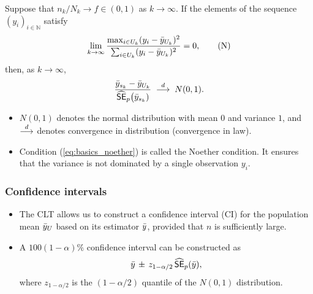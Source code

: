 \documentclass{my_eth_beamer}
\numberwithin{equation}{section}
\begin{document}
\begin{frame}
    \begin{EinSatz}\label{thm:basics_clt}
        \vspace{-0.5em}
        Suppose that $n_k/N_k \rightarrow f \in (0,1)$ as
        $k \rightarrow \infty$. If the elements of the sequence
        $(y_i)_{i \in \mathbb{N}}$ satisfy
        \begin{equation}
            \lim_{k \rightarrow \infty} \frac{\max_{i \in U_k} (y_i -
                \bar{y}_{U_k})^2}{\sum_{i \in U_k}
                (y_i - \bar{y}_{U_k})^2} = 0,
                \tag{N}\label{eq:basics_noether}
        \end{equation}
        \noindent then, as $k \rightarrow \infty$,
        \begin{equation*}
            \frac{\bar{y}_{s_k}
            -\bar{y}_{U_k}}{\widehat{\mathsf{SE}}_p\big(\bar{y}_{s_k})} \;
            \overset{d}{\longrightarrow} \; N(0, 1).
        \end{equation*}
    \end{EinSatz}
    \begin{itemize}
        \item $N(0,1)$ denotes the normal distribution with mean $0$ and
            variance $1$, and $\overset{d}{\longrightarrow}$ denotes convergence in distribution
            (convergence in law).
        \item Condition (\ref{eq:basics_noether}) is called the Noether
            condition. It ensures that the variance is not dominated by a
            single observation $y_i$.
    \end{itemize}
\end{frame}

\begin{frame}
    \frametitle{\normalsize Confidence intervals}
    \begin{itemize}
    \setlength{\itemsep}{12pt}
        \item The CLT allows us to construct a \alert{confidence interval}
            (CI) for the population mean $\bar{y}_U$ based on its \SRS estimator
            $\bar{y}$, provided that $n$ is sufficiently large.
        \item A $100(1 - \alpha)\%$ confidence interval can be constructed as
            \begin{equation*}
                \bar{y} \, \pm \, z_{1 - \alpha / 2} \, \widehat{\mathsf{SE}}_p(\bar{y}),
            \end{equation*}
            \noindent where $z_{1 - \alpha/2}$ is the
            $(1 - \alpha/2)$ quantile of the $N(0,1)$ distribution.
    \end{itemize}
\end{frame}
\end{document}
